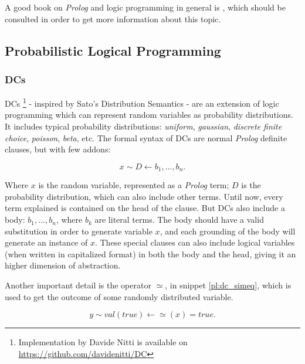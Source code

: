 A good book on \textit{Prolog} and logic programming in general is
\cite{nilsson1990logic}, which should be consulted in order to get more
information about this topic.

\subsection{Probabilistic Logical Programming}

\subsubsection{\glspl{DC}}

\glspl{DC} \footnote{Implementation by Davide Nitti is available on
\url{https://github.com/davidenitti/DC}} \cite{nitti2014relational}
\cite{nitti2016probabilistic} - inspired by Sato's Distribution Semantics \cite{sato1995statistical} - 
are an extension of logic programming which can
represent random variables as probability distributions. It includes typical
probability distributions: \textit{uniform}, \textit{gaussian},
\textit{discrete finite choice}, \textit{poisson}, \textit{beta}, etc.
The formal syntax of \glspl{DC} are normal \textit{Prolog} definite clauses, but
with few addons:

\begin{equation}
    x \sim D \leftarrow b_1, ..., b_n.
    \label{pl:dc_clause}
\end{equation}

Where $x$ is the random variable, represented as a \textit{Prolog} term; $D$ is
the probability distribution, which can also include other terms. Until now,
every term explained is contained on the head of the clause. But \glspl{DC} also
include a body: $b_1, ..., b_n$, where $b_k$ are literal terms.
The body should have a valid substitution in
order to generate variable $x$, and each grounding of the body will generate an
instance of $x$. These special clauses can also include logical variables
(when written in capitalized format) in
both the body and the head, giving it an higher dimension of abstraction.

Another important detail is the operator $\simeq$, in snippet \ref{pl:dc_simeq},
which is used to get the outcome of some randomly distributed variable.

\begin{equation}
    y \sim val(true) \leftarrow \simeq(x) = true.
    \label{pl:dc_simeq}
\end{equation}

